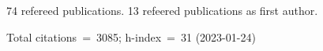 74 refereed publications. 13 refeered publications as first author.

Total citations~=~3085; h-index~=~31 (2023-01-24)